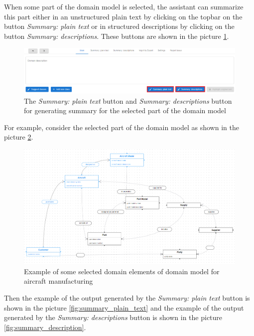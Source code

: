 When some part of the domain model is selected, the assistant can summarize this part either in an unstructured plain text by clicking on the topbar on the button \textit{Summary: plain text} or in structured descriptions by clicking on the button \textit{Summary: descriptions}. These buttons are shown in the picture \ref{fig:summary_buttons}.

\begin{figure}[!h]
    \includegraphics[scale=0.35]{../docs/images/frontend/summary-buttons.png}
    \caption{\centering The \textit{Summary: plain text} button and \textit{Summary: descriptions} button for generating summary for the selected part of the domain model}
    \label{fig:summary_buttons}
\end{figure}

For example, consider the selected part of the domain model as shown in the picture \ref{fig:selection_aircraft}.

\begin{figure}[!h]
    \includegraphics[scale=0.38]{../docs/images/frontend/selection-aircraft.png}
    \caption{\centering Example of some selected domain elements of domain model for aircraft manufacturing}
    \label{fig:selection_aircraft}
\end{figure}

Then the example of the output generated by the \textit{Summary: plain text} button is shown in the picture \ref{fig:summary_plain_text} and the example of the output generated by the \textit{Summary: descriptions} button is shown in the picture \ref{fig:summary_description}.

